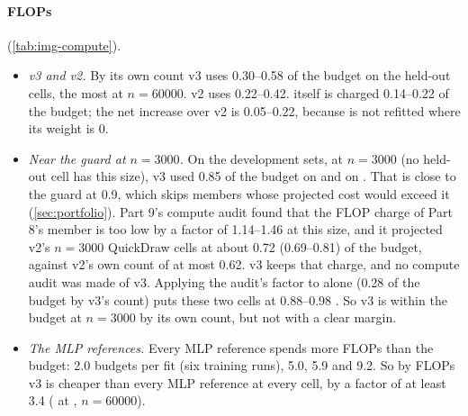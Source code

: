 \paragraph{FLOPs}  (\cref{tab:img-compute}).
\begin{itemize}
\item \emph{v3 and v2.} By its own count v3 uses 0.30--0.58 of the budget on the held-out cells, the most at $n=60000$. v2 uses 0.22--0.42.  itself is charged 0.14--0.22 of the budget; the net increase over v2 is 0.05--0.22, because  is not refitted where its weight is 0.
\item \emph{Near the guard at $n=3000$.} On the development sets, at $n=3000$ (no held-out cell has this size), v3 used 0.85 of the budget on  and on . That is close to the guard at 0.9, which skips members whose projected cost would exceed it (\cref{sec:portfolio}). Part 9's compute audit found that the FLOP charge of Part 8's  member is too low by a factor of 1.14--1.46 at this size, and it projected v2's $n=3000$ QuickDraw cells at about 0.72 (0.69--0.81) of the budget, against v2's own count of at most 0.62. v3 keeps that charge, and no compute audit was made of v3. Applying the audit's factor to  alone (0.28 of the budget by v3's count) puts these two cells at 0.88--0.98 . So v3 is within the budget at $n=3000$ by its own count, but not with a clear margin.
\item \emph{The MLP references.} Every MLP reference spends more FLOPs than the budget:  2.0 budgets per fit (six training runs),  5.0,  5.9 and  9.2. So by FLOPs v3 is cheaper than every MLP reference at every cell, by a factor of at least 3.4 ( at , $n=60000$).
\end{itemize}

